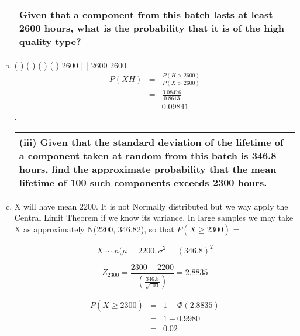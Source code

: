\documentclass[a4paper,12pt]{article}
\begin{document}
\begin{enumerate}[(a)]
   
\newpage
\begin{table}[ht!]
 \centering
 \begin{tabular}{|p{15cm}|}
 \hline
\noindent Given that a component from this batch lasts at least 2600 hours,
what is the probability that it is of the high quality type?
\\ \hline
  \end{tabular}
\end{table}
\item  ( ) ( ) ( )
( )
2600 |  | 2600 
2600 
\begin{eqnarray*}
P (X  H) &=& \frac{P(H>2600)}{P(X>2600)}\\
&=& \frac{0.08476}{0.8613}\\
&=& 0.09841
\end{eqnarray*}.

\newpage
\begin{table}[ht!]
 \centering
 \begin{tabular}{|p{15cm}|}
 \hline
\noindent (iii) Given that the standard deviation of the lifetime of a component
taken at random from this batch is 346.8 hours, find the
approximate probability that the mean lifetime of 100 such
components exceeds 2300 hours.
\\ \hline
  \end{tabular}
\end{table}
\item X will have mean 2200. It is not Normally distributed but we way
apply the Central Limit Theorem if we know its variance. In large samples we
may take X as approximately N(2200, 346.82), so that $P(\bar{X}\geq 2300)$ = 
  
\[\bar{X} \sim n(\mu = 2200, \sigma^2 = (346.8)^2\]
   
 \[Z_{2300}  =   \frac{2300-2200}{   \left(\frac{346.8}{\sqrt{100}} \right)} = 2.8835\]



\begin{eqnarray*} 
P(\bar{X}\geq 2300) &=& 1- \Phi(2.8835)\\  &=& 1- 0.9980 \\&=& 0.02
\end{eqnarray*}

\end{enumerate}

  

  
\end{document}
